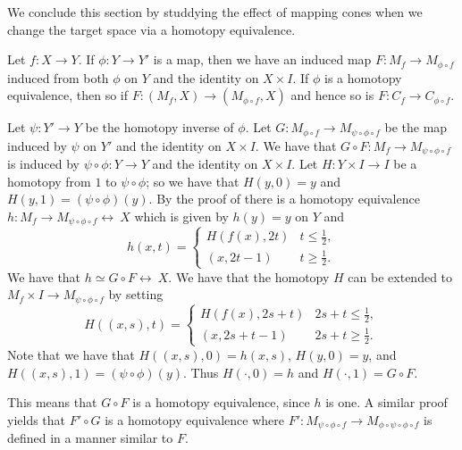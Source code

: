 \documentclass[letterpaper, 11pt, oneside]{book}
\begin{document}
We conclude this section by studdying the effect of mapping cones when we change the target space via a homotopy equivalence.
\begin{thrm}
  Let $f\colon X \to Y$.
  If $\phi\colon Y \to Y'$ is a map, then we have an induced map $F\colon M_{f} \to M_{\phi \circ f}$ induced from both $\phi$ on $Y$ and the identity on $X \times I$.
  If $\phi$ is a homotopy equivalence, then so if $F\colon(M_{f}, X) \to (M_{\phi \circ f}, X)$ and hence so is $F\colon C_{f} \to C_{\phi \circ f}$.
\end{thrm}
\begin{pf}
  Let $\psi\colon Y' \to Y$ be the homotopy inverse of $\phi$.
  Let $G\colon M_{\phi \circ f} \to M_{\psi \circ \phi \circ f}$ be the map induced by $\psi$ on $Y'$ and the identity on $X \times I$.
  We have that $G \circ F\colon M_{f} \to M_{\psi \circ \phi \circ f}$ is induced by $\psi \circ \phi\colon Y \to Y$ and the identity on $X \times I$.
  Let $H\colon Y \times I \to I$ be a homotopy from $1$ to $\psi \circ \phi$; so we have that $H(y, 0) = y$ and $H(y, 1) = (\psi \circ \phi)(y)$.
  By the proof of  there is a homotopy equivalence $h\colon M_{f} \to M_{\psi \circ \phi \circ f} \rel\ X$ which is given by $h(y) = y$ on $Y$ and
  \[
    h(x, t) =
    \begin{cases}
      H(f(x), 2t) & t \leq \frac{1}{2}, \\
      (x, 2t - 1) & t \geq \frac{1}{2}.
    \end{cases}
  \]
  We have that $h \simeq G \circ F \rel\ X$.
  We have that the homotopy $H$ can be extended to $M_{f} \times I \to M_{\psi \circ \phi \circ f}$ by setting
  \[
     H((x, s), t) =
     \begin{cases}
       H(f(x), 2s + t) & 2s + t \leq \frac{1}{2}, \\
       (x, 2s + t - 1) & 2s + t \geq \frac{1}{2}.
     \end{cases}
   \]
   Note that we have that $H((x, s), 0) = h(x, s)$, $H(y, 0) = y$, and $H((x, s), 1) = (\psi \circ \phi)(y)$.
   Thus $H(\cdot, 0) = h$ and $H(\cdot, 1) = G \circ F$.

   This means that $G \circ F$ is a homotopy equivalence, since $h$ is one.
   A similar proof yields that $F' \circ G$ is a homotopy equivalence where $F'\colon M_{\psi \circ \phi \circ f} \to  M_{\phi \circ \psi \circ \phi \circ f}$ is defined in a manner similar to $F$.


\end{pf}
\end{document}

